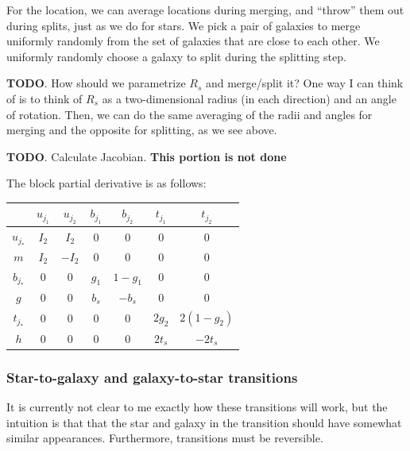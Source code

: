 \documentclass[11pt]{article}
\begin{document}
For the location, we can average locations during merging, and ``throw'' them out during
splits, just as we do for stars. We pick a pair of galaxies to merge uniformly randomly from
the set of galaxies that are close to each other. We uniformly
randomly choose a galaxy to split during the splitting step.

\textbf{TODO}.
How should we parametrize $R_s$ and merge/split it? One way I can think of is to think of $R_s$
as a two-dimensional radius (in each direction) and an angle of rotation. Then, we can do the
same averaging of the radii and angles for merging and the opposite for splitting, as we
see above.

\textbf{TODO}. Calculate Jacobian. \textbf{This portion is not done}

The block partial derivative is as follows:
\begin{center}
\begin{tabular}{|c||c|c|c|c|c|c|}
\cline{2-7} 
\multicolumn{1}{c|}{} & $u_{j_{1}}$ & $u_{j_{2}}$ & $b_{j_{1}}$ & $b_{j_{2}}$ & $t_{j_1}$ & $t_{j_2}$\tabularnewline
\hline 
$u_{j_{*}}$ & $I_2$ & $I_2$ & $0$ & $0$ & 0 & 0\tabularnewline
\hline 
$m$ & $I_2$ & $-I_2$ & $0$ & $0$ & 0 & 0\tabularnewline
\hline 
$b_{j_{*}}$ & $0$ & $0$ & $g_1$ & $1-g_1$ & $0$ & $0$\tabularnewline
\hline 
$g$ & $0$ & $0$ & $b_s$ & $-b_s$ & $0$ & $0$ \tabularnewline
\hline
$t_{j_{*}}$ & $0$ & $0$ & $0$ & $0$ & $2g_2$ & $2 (1-g_2)$\tabularnewline
\hline
$h$ & $0$ & $0$ & $0$ & $0$ &$2t_s$ & $-2t_s$\tabularnewline
\hline
\end{tabular}
\par\end{center}

\subsubsection{Star-to-galaxy and galaxy-to-star transitions}

It is currently not clear to me exactly how these transitions will work, but the intuition is that that
the star and galaxy in the transition should have somewhat similar appearances. Furthermore,
transitions must be reversible.
\end{document}
